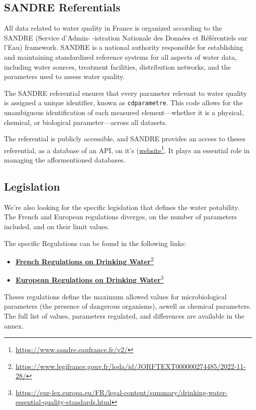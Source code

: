 \documentclass{article}
\begin{document}
\newpage
\subsection{SANDRE Referentials}
All data related to water quality in France is organized according to the SANDRE
(Service d’Admin- -istration Nationale des Données et Référentiels sur l’Eau) framework. SANDRE is a national authority responsible for establishing and maintaining standardized reference systems for all aspects of water data, including water sources, treatment facilities, distribution networks, and the parameters used to assess water quality.

The SANDRE referential ensures that every parameter relevant to water quality is assigned a unique identifier, known as \texttt{cdparametre}. This code allows for the unambiguous identification of each measured element—whether it is a physical, chemical, or biological parameter—across all datasets.

The referential is publicly accessible, and SANDRE provides an access to theses referential, as a database of an API, on it's (\href{https://www.sandre.eaufrance.fr/v2/}{website}\footnote{\url{https://www.sandre.eaufrance.fr/v2/}}. It plays an essential role in managing the afformentioned databases.

\subsection{Legislation}
We're also looking for the specific legislation that defines the water potability.
The French and European regulations diverges, on the number of parameters included, and on their limit values.

The specific Regulations can be found in the following links:
\begin{itemize}
    \item \href{https://www.legifrance.gouv.fr/loda/id/JORFTEXT000000274485/2022-11-28/}{\textbf{French Regulations on Drinking Water}}\footnote{\url{https://www.legifrance.gouv.fr/loda/id/JORFTEXT000000274485/2022-11-28/}}
    \item \href{https://eur-lex.europa.eu/FR/legal-content/summary/drinking-water-essential-quality-standards.html}{\textbf{European Regulations on Drinking Water}}\footnote{\url{https://eur-lex.europa.eu/FR/legal-content/summary/drinking-water-essential-quality-standards.html}}
\end{itemize}

Theses regulations define the maximum allowed values for microbiological parameters (the presence of dangerous organisms), aswell as chemical parameters.
The full list of values, parameters regulated, and differences are available in the annex.
\end{document}
